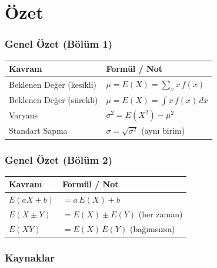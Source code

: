 \documentclass[light]{lutbeamer}
\begin{document}

\section{Özet}

\begin{frame}[fragile]
  \frametitle{Genel Özet (Bölüm 1)}
  \begin{center}
    \renewcommand{\arraystretch}{1.4}
    {\small
    \begin{tabular}{p{4.5cm}p{6.5cm}}
      \toprule
      \textbf{Kavram} & \textbf{Formül / Not} \\
      \midrule
      Beklenen Değer (kesikli) & $\mu = E(X) = \sum_x x\,f(x)$ \\
      Beklenen Değer (sürekli) & $\mu = E(X) = \int x\,f(x)\,dx$ \\
      \midrule
      Varyans & $\sigma^2 = E(X^2) - \mu^2$ \\
      Standart Sapma & $\sigma = \sqrt{\sigma^2}$ \; (aynı birim) \\
      \bottomrule
    \end{tabular}
    }
  \end{center}
\end{frame}

\begin{frame}[fragile]
  \frametitle{Genel Özet (Bölüm 2)}
  \begin{center}
    \renewcommand{\arraystretch}{1.4}
    {\small
    \begin{tabular}{p{4.5cm}p{6.5cm}}
      \toprule
      \textbf{Kavram} & \textbf{Formül / Not} \\
      \midrule
      $E(aX + b)$ & $= a\,E(X) + b$ \\
      \midrule
      $E(X \pm Y)$ & $= E(X) \pm E(Y)$ \; (her zaman) \\
      $E(XY)$ & $= E(X)\,E(Y)$ \; (bağımsızsa) \\
      \bottomrule
    \end{tabular}
    }
  \end{center}
\end{frame}

\begin{frame}[allowframebreaks]
  \frametitle{Kaynaklar}
  \nocite{walpole_ch4}
  \printbibliography{}
\end{frame}

\appendix
\end{document}
